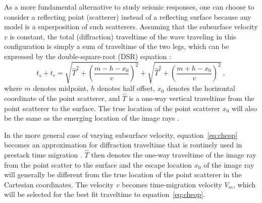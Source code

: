 As a more fundamental alternative to study seismic responses, one can choose to consider a reflecting point (scatterer) instead of a reflecting surface because any model is a superposition of such scatterers. Assuming that the subsurface velocity $v$ is constant, the total (diffraction) traveltime of the wave traveling in this configuration is simply a sum of traveltime of the two legs, which can be expressed by the double-square-root (DSR) equation \cite[]{bei}:
\begin{equation}
\label{eq:cheop}
t_s + t_r = \sqrt{\hat{T}^2 + \left(\frac{m-h-x_0}{v}\right)^2} + \sqrt{\hat{T}^2 + \left(\frac{m+h-x_0}{v}\right)^2}~,
\end{equation}
where $m$ denotes midpoint, $h$ denotes half offset, $x_0$ denotes the horizontal coordinate of the point scatterer, and $\hat{T}$ is a one-way vertical traveltime from the point scatterer to the surface. The true location of the point scatterer $x_0$ will also be the same as the emerging location of the image rays \cite[]{hubralimageray}.

In the more general case of varying subsurface velocity, equation~\ref{eq:cheop} becomes an approximation for diffraction traveltime that is routinely used in prestack time migration \cite[]{yilmaz}. $\hat{T}$ then denotes the one-way traveltime of the image ray from the point scatter to the surface and the escape location $x_0$ of the image ray will generally be different from the true location of the point scatterer in the Cartesian coordinates. The velocity $v$ becomes time-migration velocity $V_m$, which will be selected for the best fit traveltime to equation~\ref{eq:cheop}.

